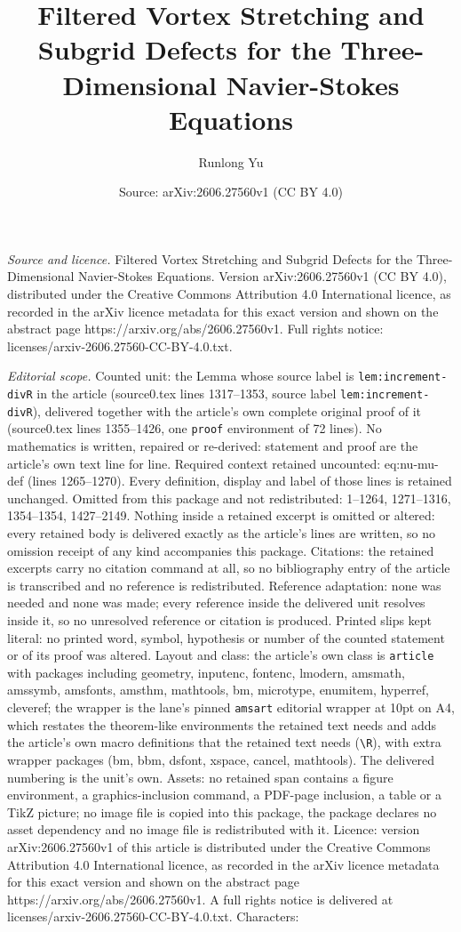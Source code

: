 \documentclass[10pt,a4paper]{amsart}
\title[Filtered Vortex Stretching and Subgrid Defects for the Three]{Filtered Vortex Stretching and Subgrid Defects for the Three-Dimensional Navier-Stokes Equations}
\author{Runlong Yu}
\date{Source: arXiv:2606.27560v1 (CC BY 4.0)}
\begin{document}
\maketitle

\noindent\emph{Source and licence.} Filtered Vortex Stretching and Subgrid Defects for the Three-Dimensional Navier-Stokes Equations. Version arXiv:2606.27560v1 (CC BY 4.0), distributed under the Creative Commons Attribution 4.0 International licence, as recorded in the arXiv licence metadata for this exact version and shown on the abstract page https://arxiv.org/abs/2606.27560v1. Full rights notice: licenses/arxiv-2606.27560-CC-BY-4.0.txt.\par\smallskip

\noindent\textit{Editorial scope.} Counted unit: the Lemma whose source label is \texttt{lem:increment-divR} in the article (source0.tex lines 1317--1353, source label \texttt{lem:increment-divR}), delivered together with the article's own complete original proof of it (source0.tex lines 1355--1426, one \texttt{proof} environment of 72 lines). No mathematics is written, repaired or re-derived: statement and proof are the article's own text line for line. Required context retained uncounted: eq:nu-mu-def (lines 1265--1270). Every definition, display and label of those lines is retained unchanged. Omitted from this package and not redistributed: 1--1264, 1271--1316, 1354--1354, 1427--2149. Nothing inside a retained excerpt is omitted or altered: every retained body is delivered exactly as the article's lines are written, so no omission receipt of any kind accompanies this package. Citations: the retained excerpts carry no citation command at all, so no bibliography entry of the article is transcribed and no reference is redistributed. Reference adaptation: none was needed and none was made; every reference inside the delivered unit resolves inside it, so no unresolved reference or citation is produced. Printed slips kept literal: no printed word, symbol, hypothesis or number of the counted statement or of its proof was altered. Layout and class: the article's own class is \texttt{article} with packages including geometry, inputenc, fontenc, lmodern, amsmath, amssymb, amsfonts, amsthm, mathtools, bm, microtype, enumitem, hyperref, cleveref; the wrapper is the lane's pinned \texttt{amsart} editorial wrapper at 10pt on A4, which restates the theorem-like environments the retained text needs and adds the article's own macro definitions that the retained text needs (\texttt{\textbackslash R}), with extra wrapper packages (bm, bbm, dsfont, xspace, cancel, mathtools). The delivered numbering is the unit's own. Assets: no retained span contains a figure environment, a graphics-inclusion command, a PDF-page inclusion, a table or a TikZ picture; no image file is copied into this package, the package declares no asset dependency and no image file is redistributed with it. Licence: version arXiv:2606.27560v1 of this article is distributed under the Creative Commons Attribution 4.0 International licence, as recorded in the arXiv licence metadata for this exact version and shown on the abstract page https://arxiv.org/abs/2606.27560v1. A full rights notice is delivered at licenses/arxiv-2606.27560-CC-BY-4.0.txt. Characters: 
\end{document}
